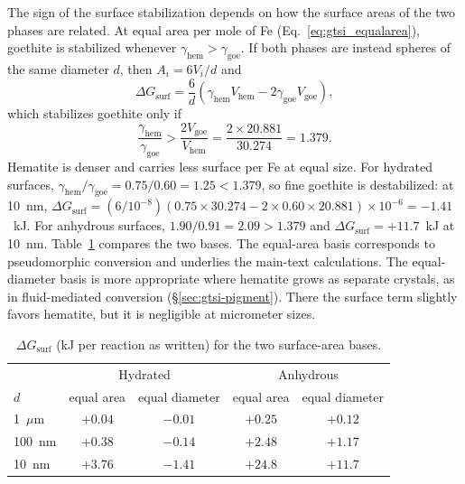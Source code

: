 The sign of the surface stabilization depends on how the surface areas of the two phases are
related. At equal area per mole of Fe (Eq.~\eqref{eq:gtsi_equalarea}), goethite is stabilized
whenever $\gamma_{\mathrm{hem}}>\gamma_{\mathrm{goe}}$. If both phases are instead spheres of the
same diameter $d$, then $A_i = 6V_i/d$ and
\begin{equation}
  \Delta G_{\mathrm{surf}} = \frac{6}{d}\left(\gamma_{\mathrm{hem}}V_{\mathrm{hem}} - 2\gamma_{\mathrm{goe}}V_{\mathrm{goe}}\right),
\end{equation}
which stabilizes goethite only if
\begin{equation}
  \frac{\gamma_{\mathrm{hem}}}{\gamma_{\mathrm{goe}}} > \frac{2V_{\mathrm{goe}}}{V_{\mathrm{hem}}} = \frac{2\times20.881}{30.274} = 1.379 .
\end{equation}
Hematite is denser and carries less surface per Fe at equal size. For hydrated surfaces,
$\gamma_{\mathrm{hem}}/\gamma_{\mathrm{goe}} = 0.75/0.60 = 1.25 < 1.379$, so fine goethite is
destabilized: at 10~nm,
$\Delta G_{\mathrm{surf}} = (6/10^{-8})(0.75\times30.274 - 2\times0.60\times20.881)\times10^{-6} = -1.41$~kJ.
For anhydrous surfaces, $1.90/0.91 = 2.09 > 1.379$ and $\Delta G_{\mathrm{surf}} = +11.7$~kJ at
10~nm. Table~\ref{tab:gtsi_basis} compares the two bases. The equal-area basis corresponds to
pseudomorphic conversion and underlies the main-text calculations. The equal-diameter basis is
more appropriate where hematite grows as separate crystals, as in fluid-mediated conversion
(\S\ref{sec:gtsi-pigment}). There the surface term slightly favors hematite, but it is
negligible at micrometer sizes.

\begin{table}[htbp]
  \centering
  \caption{$\Delta G_{\mathrm{surf}}$ (kJ per reaction as written) for the two surface-area bases.}
  \label{tab:gtsi_basis}
  \begin{tabular}{lcccc}
    \hline
    & \multicolumn{2}{c}{Hydrated} & \multicolumn{2}{c}{Anhydrous} \\
    $d$ & equal area & equal diameter & equal area & equal diameter \\
    \hline
    1~$\mu$m & $+0.04$ & $-0.01$ & $+0.25$ & $+0.12$ \\
    100~nm & $+0.38$ & $-0.14$ & $+2.48$ & $+1.17$ \\
    10~nm & $+3.76$ & $-1.41$ & $+24.8$ & $+11.7$ \\
    \hline
  \end{tabular}
\end{table}

